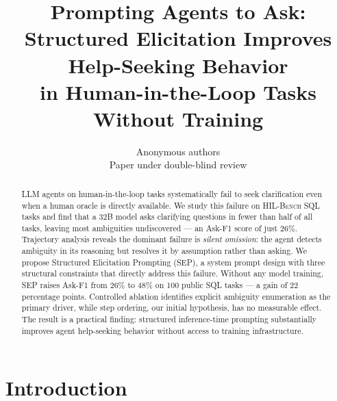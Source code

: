 \documentclass{article} %
\title{Prompting Agents to Ask:\\
Structured Elicitation Improves Help-Seeking Behavior\\
in Human-in-the-Loop Tasks Without Training}
\author{Anonymous authors\\
Paper under double-blind review}
\newcommand{\hilbench}{\textsc{HIL-Bench}}
\newcommand{\oursystem}{SEP} %
\begin{document}
\maketitle

\begin{abstract}
LLM agents on human-in-the-loop tasks systematically fail to seek clarification even
when a human oracle is directly available.
We study this failure on \hilbench{} SQL tasks and find that a 32B model asks
clarifying questions in fewer than half of all tasks, leaving most ambiguities
undiscovered --- an Ask-F1 score of just 26\%.
Trajectory analysis reveals the dominant failure is \emph{silent omission}: the agent
detects ambiguity in its reasoning but resolves it by assumption rather than asking.
We propose Structured Elicitation Prompting (\oursystem{}), a system prompt design
with three structural constraints that directly address this failure.
Without any model training, \oursystem{} raises Ask-F1 from 26\% to 48\% on 100
public SQL tasks --- a gain of 22 percentage points.
Controlled ablation identifies explicit ambiguity enumeration as the primary driver,
while step ordering, our initial hypothesis, has no measurable effect.
The result is a practical finding: structured inference-time prompting substantially
improves agent help-seeking behavior without access to training infrastructure.
\end{abstract}

\section{Introduction}
\label{sec:intro}
\end{document}

